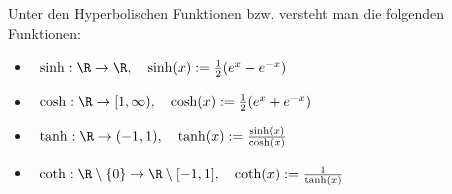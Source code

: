 Unter den Hyperbolischen Funktionen bzw.  versteht man die folgenden Funktionen:
\begin{itemize}[label="",leftmargin=0pt]
    \item {} \, $\sinh : \R \to \R, \quad \sinh(x) := \frac{1}{2}(e^x-e^{-x})$
    \item {} \, $\cosh : \R \to [1, \infty), \quad \cosh(x) := \frac{1}{2}(e^x+e^{-x})$
    \item {} \, $\tanh : \R \to (-1, 1), \quad \tanh(x) := \frac{\sinh(x)}{\cosh(x)}$
    \item {} \, $\coth : \R \setminus \{0\} \to \R \setminus [-1, 1], \quad \coth(x) := \frac{1}{\tanh(x)}$
\end{itemize}